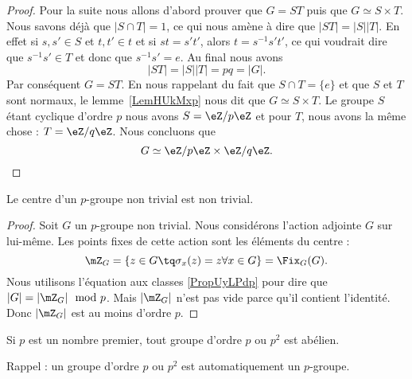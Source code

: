 \begin{proof}
    Pour la suite nous allons d'abord prouver que \( G=ST\) puis que \( G\simeq S\times T\). Nous savons déjà que \( | S\cap T |=1\), ce qui nous amène à dire que \( | ST |=| S | |T |\). En effet si \( s,s'\in S\) et \( t,t'\in t\) et si \( st=s't'\), alors \( t=s^{-1}s't'\), ce qui voudrait dire que \( s^{-1}s'\in T\) et donc que \( s^{-1}s'=e\). Au final nous avons
    \begin{equation}
        | ST |=| S | |T |=pq=| G |.
    \end{equation}
    Par conséquent \( G=ST\). En nous rappelant du fait que \( S\cap T=\{ e \}\) et que \( S\) et \( T\) sont normaux, le lemme~\ref{LemHUkMxp} nous dit que \( G\simeq S\times T\). Le groupe \( S\) étant cyclique d'ordre \( p\) nous avons \( S=\eZ/p\eZ\) et pour \( T\), nous avons la même chose : \( T=\eZ/q\eZ\). Nous concluons que
    \begin{equation}
        G\simeq \eZ/p\eZ\times \eZ/q\eZ.
    \end{equation}
\end{proof}



\begin{theorem} \label{ThoImkljy}
    Le centre d'un \( p\)-groupe non trivial est non trivial.
\end{theorem}

\begin{proof}
    Soit \( G\) un $p$-groupe non trivial. Nous considérons l'action adjointe \( G\) sur lui-même. Les points fixes de cette action sont les éléments du centre :
    \begin{equation}
        \mZ_G=\{ z\in G\tq \sigma_x(z)=z\forall x\in G \}=\Fix_G(G).
    \end{equation}
    Nous utilisons l'équation aux classes \eqref{PropUyLPdp} pour dire que \( | G |=| \mZ_G |\mod p\). Mais \( | \mZ_G |\) n'est pas vide parce qu'il contient l'identité. Donc \( | \mZ_G |\) est au moins d'ordre \( p\).
\end{proof}

\begin{proposition} \label{PropssttFK}
    Si \( p\) est un nombre premier, tout groupe d'ordre \( p\) ou \( p^2\) est abélien.
\end{proposition}
Rappel : un groupe d'ordre \( p\) ou \( p^2\) est automatiquement un $p$-groupe.


